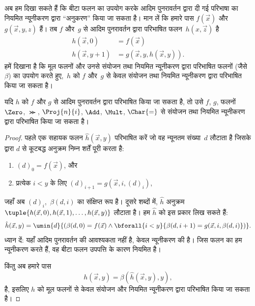 \documentclass[../../../include/open-logic-section]{subfiles}
\begin{document}

अब हम दिखा सकते हैं कि बीटा फलन का उपयोग करके आदिम पुनरावर्तन द्वारा दी गई
परिभाषा का नियमित न्यूनीकरण द्वारा ``अनुकरण'' किया जा सकता है। मान लें कि
हमारे पास $f(\vec x)$ और $g(\vec x, y, z)$ हैं। तब $f$ और~$g$ से आदिम
पुनरावर्तन द्वारा परिभाषित फलन~$h(x,\vec z)$ है
\begin{align*}
h(\vec x, 0) & =  f(\vec x) \\
h(\vec x, y+1) & =  g(\vec x, y, h(\vec x, y)).
\end{align*}
हमें दिखाना है कि मूल फलनों और उनसे संयोजन तथा नियमित न्यूनीकरण द्वारा
परिभाषित फलनों (जैसे~$\beta$) का उपयोग करते हुए,~$h$ को $f$ और~$g$ से केवल
संयोजन तथा नियमित न्यूनीकरण द्वारा परिभाषित किया जा सकता है।

\begin{lem}
यदि $h$ को $f$ और $g$ से आदिम पुनरावर्तन द्वारा परिभाषित किया जा सकता है,
तो उसे $f$, $g$, फलनों $\Zero$, $\Succ$, $\Proj{n}{i}$, $\Add$, $\Mult$,
$\Char{=}$ से संयोजन तथा नियमित न्यूनीकरण द्वारा परिभाषित किया जा सकता है।
\end{lem}

\begin{proof}
पहले एक सहायक फलन $\hat h(\vec x, y)$ परिभाषित करें जो वह न्यूनतम
संख्या~$d$ लौटाता है जिसके द्वारा $d$ से कूटबद्ध अनुक्रम निम्न शर्तें पूरी करता है:
\begin{enumerate}
\item $(d)_0 = f(\vec x)$, और
\item प्रत्येक $i < y$ के लिए $(d)_{i+1} = g(\vec x, i, (d)_i)$,
\end{enumerate}
जहाँ अब $(d)_i$,~$\beta(d,i)$ का संक्षिप्त रूप है। दूसरे शब्दों में,
$\hat h$ अनुक्रम $\tuple{h(\vec x, 0), h(\vec x, 1), \dots, h(\vec
x, y)}$ लौटाता है। हम $\hat h$ को इस प्रकार लिख सकते हैं:
\[
\hat h(\vec x, y) = \umin{d}{(\beta(d,0) = f(\vec x) \land \bforall{i <
  y}{\beta(d,i+1) = g(\vec x, i,\beta(d,i)})}.
\]
ध्यान दें: यहाँ आदिम पुनरावर्तन की आवश्यकता नहीं है, केवल न्यूनीकरण की है।
जिस फलन का हम न्यूनीकरण करते हैं, वह बीटा फलन उपपत्ति
 के कारण नियमित है।

किंतु अब हमारे पास
\[
h(\vec x, y) = \beta(\hat h(\vec x, y), y),
\]
है, इसलिए $h$ को मूल फलनों से केवल संयोजन और नियमित न्यूनीकरण द्वारा
परिभाषित किया जा सकता है।
\end{proof}
\end{document}
